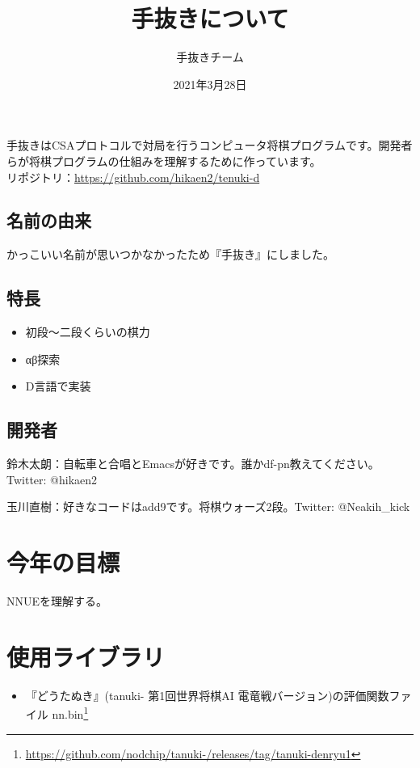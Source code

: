 \documentclass[11pt,a4paper]{ltjsarticle}
\title{手抜きについて}
\author{手抜きチーム}
\date{2021年3月28日}
\begin{document}
\maketitle


手抜きはCSAプロトコルで対局を行うコンピュータ将棋プログラムです。開発者らが将棋プログラムの仕組みを理解するために作っています。 \\
リポジトリ：\url{https://github.com/hikaen2/tenuki-d}


\subsection*{名前の由来}
かっこいい名前が思いつかなかったため『手抜き』にしました。


\subsection*{特長}

\begin{itemize}
  \item 初段〜二段くらいの棋力
  \item αβ探索
  \item D言語で実装
\end{itemize}


\subsection*{開発者}

鈴木太朗：自転車と合唱とEmacsが好きです。誰かdf-pn教えてください。Twitter: @hikaen2

玉川直樹：好きなコードはadd9です。将棋ウォーズ2段。Twitter: @Neakih\_kick


\section{今年の目標}

NNUEを理解する。


\section{使用ライブラリ}

\begin{itemize}
  \item 『どうたぬき』(tanuki- 第1回世界将棋AI 電竜戦バージョン)の評価関数ファイル nn.bin\footnote{\url{https://github.com/nodchip/tanuki-/releases/tag/tanuki-denryu1}}
\end{itemize}
\end{document}
